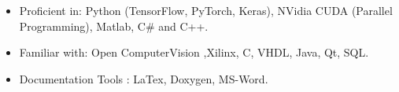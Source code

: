 
\begin{cvparagraph}
\begin{itemize}[leftmargin=*]
    \item Proficient in: Python (TensorFlow, PyTorch, Keras), NVidia CUDA (Parallel Programming), Matlab, C\# and C++.
    \item Familiar with: Open ComputerVision ,Xilinx, C, VHDL, Java, Qt, SQL.
    \item Documentation Tools : LaTex, Doxygen, MS-Word.
\end{itemize}

\end{cvparagraph}